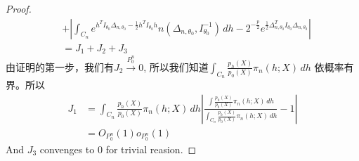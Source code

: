 \begin{proof}
\begin{equation}
\begin{aligned}
        &+\left| \int_{C_n} e^{h^TI_{\theta_0}\Delta_{n,\theta_0}-\frac{1}{2}h^TI_{\theta_0}h}n(\Delta_{n,\theta_0},I_{\theta_0}^{-1})\, dh-2^{-\frac{p}{2}}e^{\frac{1}{2}\Delta_{n,\theta_0}^TI_{\theta_0}\Delta_{n,\theta_0}}
 \right|\\
        &=J_1+J_2+J_3
\end{aligned}
\end{equation}
由证明的第一步，我们有$J_2\xrightarrow{P^n_0}0$, 所以我们知道$\int_{C_n} \frac{p_h(X)}{p_0(X)}\pi_n (h;X) \, dh $ 依概率有界。所以
\begin{equation}
\begin{aligned}
    J_1&=\int_{C_n} \frac{p_h(X)}{p_0(X)}\pi_n (h;X) \, dh\left|\frac{\int \frac{p_h(X)}{p_0(X)}\pi_n (h;X) \, dh}{\int_{C_n} \frac{p_h(X)}{p_0(X)}\pi_n (h;X) \, dh}-1\right|\\
       &=O_{P_0^n}(1)o_{P_0^n}(1)
\end{aligned}
\end{equation}
And $J_3$ convenges to $0$ for trivial reasion.
\end{proof}
